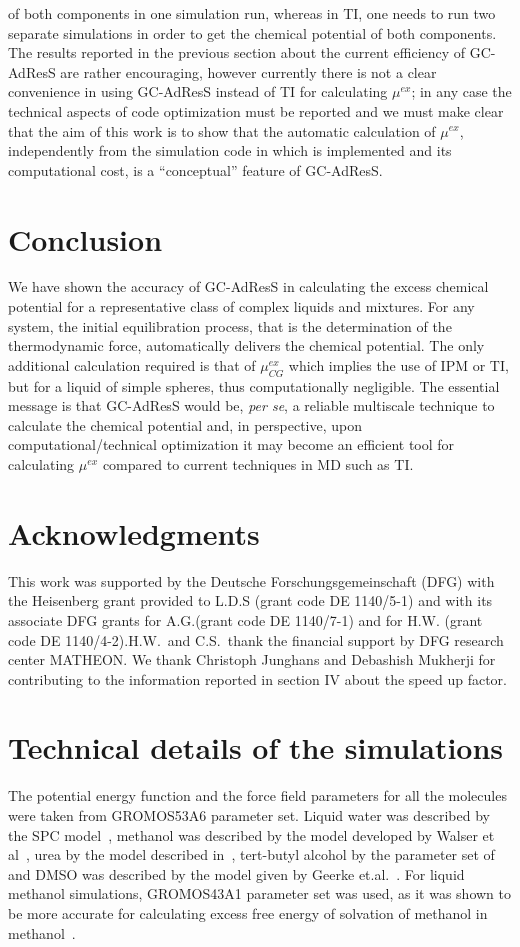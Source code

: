 \documentclass[a4paper,preprint,unsortedaddress]{revtex4-1}
\begin{document}
of both components in one simulation run, whereas in TI, one needs to run two separate simulations in order to get the chemical potential of both components.
{The results reported in the previous section about the current efficiency of GC-AdResS are rather encouraging, however currently there is not a clear convenience in using GC-AdResS instead of TI for calculating $\mu^{ex}$; 
in any case the technical aspects of code optimization must be reported and we must make clear that the aim of this work is to show that  the automatic calculation of $\mu^{ex}$, independently from the simulation code in which is implemented and its computational cost, is a ``conceptual'' feature of GC-AdResS}.
  
\section{Conclusion} 
We have shown the accuracy of GC-AdResS in calculating the excess chemical potential for a representative class of complex liquids and mixtures. 
For any system, the initial equilibration process, that is the determination of the thermodynamic force, automatically delivers the chemical potential. The only additional calculation required is that of $\mu^{ex}_{CG}$ which implies the use of IPM or TI, but for a liquid of simple spheres, thus computationally negligible.  
The essential message is that GC-AdResS would be, {\it per se}, a reliable multiscale technique to calculate the chemical potential and, in perspective, upon computational/technical optimization it may become an efficient tool for calculating $\mu^{ex}$ compared to current techniques in MD such as TI. 

\section*{Acknowledgments}
This work was supported by the Deutsche Forschungsgemeinschaft (DFG) with the Heisenberg grant provided to L.D.S (grant code DE 1140/5-1) and with its associate DFG grants for A.G.(grant code DE 1140/7-1) and for H.W. (grant code DE 1140/4-2).H.W.~and C.S.~thank the financial support by DFG research center MATHEON. {We thank Christoph Junghans and Debashish Mukherji for contributing to the information reported in section IV about the speed up factor}.


\appendix
\section{Technical details of the simulations}\label{app:tmp1}
The potential energy function and the force field parameters for all the molecules
were taken from GROMOS53A6 parameter set. Liquid water was described by the SPC
model~\cite{spc}, methanol was described by the model developed by Walser et al~\cite{walser},
urea by the model described in~\cite{urea}, tert-butyl alcohol by the parameter set of~\cite{nico}
and DMSO was described by the model given by Geerke et.al.~\cite{dmso1}. For liquid methanol simulations, 
GROMOS43A1 parameter set was used, as it was shown to be more accurate for calculating excess free energy of 
solvation of methanol in methanol~\cite{vang}. \\
\end{document}
